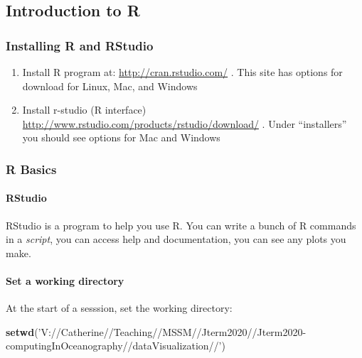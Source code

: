 \documentclass[
]{article}
\newenvironment{Shaded}{\begin{snugshade}}{\end{snugshade}}
\newcommand{\KeywordTok}[1]{\textcolor[rgb]{0.13,0.29,0.53}{\textbf{#1}}}
\newcommand{\NormalTok}[1]{#1}
\newcommand{\StringTok}[1]{\textcolor[rgb]{0.31,0.60,0.02}{#1}}
\begin{document}
\hypertarget{introduction-to-r}{%
\subsection{Introduction to R}\label{introduction-to-r}}

\hypertarget{installing-r-and-rstudio}{%
\subsubsection{Installing R and
RStudio}\label{installing-r-and-rstudio}}

\begin{enumerate}
\def\labelenumi{\arabic{enumi}.}
\item
  Install R program at: \url{http://cran.rstudio.com/} . This site has
  options for download for Linux, Mac, and Windows
\item
  Install r-studio (R interface)
  \url{http://www.rstudio.com/products/rstudio/download/} . Under
  ``installers'' you should see options for Mac and Windows
\end{enumerate}

\hypertarget{r-basics}{%
\subsubsection{R Basics}\label{r-basics}}

\hypertarget{rstudio}{%
\paragraph{RStudio}\label{rstudio}}

RStudio is a program to help you use R. You can write a bunch of R
commands in a \emph{script}, you can access help and documentation, you
can see any plots you make.

\hypertarget{set-a-working-directory}{%
\paragraph{Set a working directory}\label{set-a-working-directory}}

At the start of a sesssion, set the working directory:

\begin{Shaded}
\begin{Highlighting}[]
\KeywordTok{setwd}\NormalTok{(}\StringTok{'V://Catherine//Teaching//MSSM//Jterm2020//Jterm2020-computingInOceanography//dataVisualization//'}\NormalTok{)                                               }
\end{Highlighting}
\end{Shaded}
\end{document}
